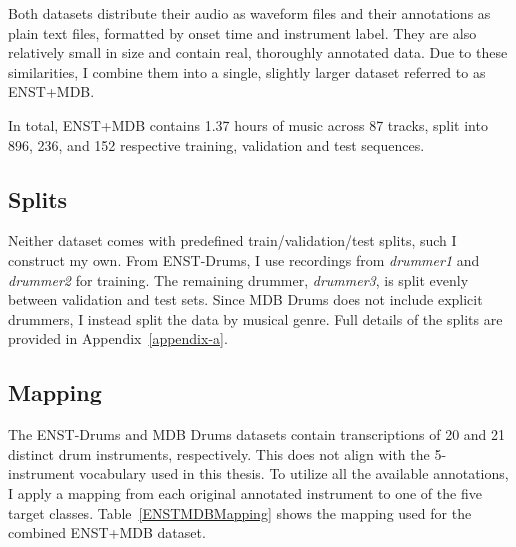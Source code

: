 Both datasets distribute their audio as waveform files and their annotations as plain text files, formatted by onset time and instrument label. They are also relatively small in size and contain real, thoroughly annotated data. Due to these similarities, I combine them into a single, slightly larger dataset referred to as ENST+MDB.

In total, ENST+MDB contains 1.37 hours of music across 87 tracks, split into 896, 236, and 152 respective training, validation and test sequences.

\subsection{Splits}

Neither dataset comes with predefined train/validation/test splits, such I construct my own. From ENST-Drums, I use recordings from \textit{drummer1} and \textit{drummer2} for training. The remaining drummer, \textit{drummer3}, is split evenly between validation and test sets. Since MDB Drums does not include explicit drummers, I instead split the data by musical genre. Full details of the splits are provided in Appendix~\ref{appendix-a}.

\subsection{Mapping}

The ENST-Drums and MDB Drums datasets contain transcriptions of 20 and 21 distinct drum instruments, respectively. This does not align with the 5-instrument vocabulary used in this thesis. To utilize all the available annotations, I apply a mapping from each original annotated instrument to one of the five target classes. Table~\ref{ENSTMDBMapping} shows the mapping used for the combined ENST+MDB dataset.

